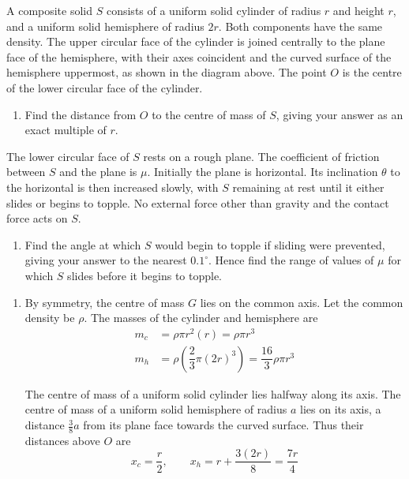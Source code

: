 \documentclass[leqno]{article}
\begin{document}
\begin{enumerate}[
  label=\textbf{\arabic*.},
  leftmargin=*,
  topsep=0pt,
  partopsep=0pt,
  parsep=0pt
]
A composite solid $S$ consists of a uniform solid cylinder of radius $r$ and height $r$, and a uniform solid hemisphere of radius $2r$. Both components have the same density. The upper circular face of the cylinder is joined centrally to the plane face of the hemisphere, with their axes coincident and the curved surface of the hemisphere uppermost, as shown in the diagram above. The point $O$ is the centre of the lower circular face of the cylinder. \\
\begin{enumerate}[label=\textbf{(\alph*)}]
\item Find the distance from $O$ to the centre of mass of $S$, giving your answer as an exact multiple of $r$.  \\
\end{enumerate}
The lower circular face of $S$ rests on a rough plane. The coefficient of friction between $S$ and the plane is $\mu$. Initially the plane is horizontal. Its inclination $\theta$ to the horizontal is then increased slowly, with $S$ remaining at rest until it either slides or begins to topple. No external force other than gravity and the contact force acts on $S$. \\
\begin{enumerate}[label=\textbf{(\alph*)}, resume]
\item Find the angle at which $S$ would begin to topple if sliding were prevented, giving your answer to the nearest $0.1^\circ$. Hence find the range of values of $\mu$ for which $S$ slides before it begins to topple.  \\
\end{enumerate}

\vspace*{10pt}

\begin{djsSolution}
\begin{enumerate}[label=\textbf{(\alph*)}, start=1]
\item
By symmetry, the centre of mass \(G\) lies on the common axis. Let the common density be \(\rho\). The masses of the cylinder and hemisphere are
\begin{align*}
m_c&=\rho\pi r^2(r)=\rho\pi r^3\\
m_h&=\rho\left(\dfrac23\pi(2r)^3\right)=\dfrac{16}{3}\rho\pi r^3
\end{align*}

The centre of mass of a uniform solid cylinder lies halfway along its axis.
The centre of mass of a uniform solid hemisphere of radius \(a\) lies on its axis, a distance \(\frac38 a\) from its plane face towards the curved surface.
Thus their distances above \(O\) are
\[
x_c=\dfrac r2,\qquad x_h=r+\dfrac{3(2r)}8=\dfrac{7r}{4}
\]


\end{enumerate}
\end{djsSolution}
\end{enumerate}
\end{document}
